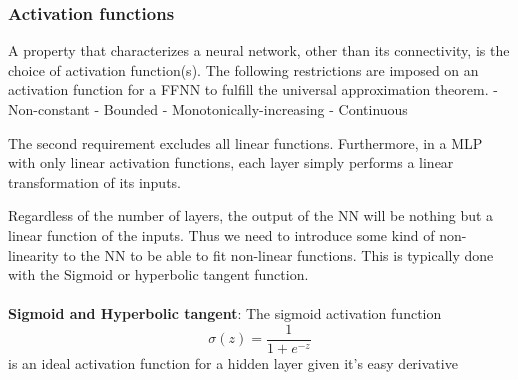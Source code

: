 \subsubsection{Activation functions}
%
A property that characterizes a neural network, other than its connectivity, is
the choice of activation function(s). 
The following restrictions are imposed on an activation function for a FFNN to
fulfill the universal approximation theorem.
- Non-constant
- Bounded
- Monotonically-increasing
- Continuous

The second requirement excludes all linear functions. Furthermore, in a MLP
with only linear activation functions, each layer simply performs a linear
transformation of its inputs.

Regardless of the number of layers, the output of the NN will be nothing but a
linear function of the inputs. Thus we need to introduce some kind of
non-linearity to the NN to be able to fit non-linear functions. This is
typically done with the Sigmoid or hyperbolic tangent function.
\\~\\
\textbf{Sigmoid and Hyperbolic tangent}:
The sigmoid activation function
\begin{equation*}
    \label{eq:sigmoid} 
    \sigma(z) = \frac{1}{1+e^{-z}}
\end{equation*}
is an ideal activation function for a hidden layer given it's easy derivative

